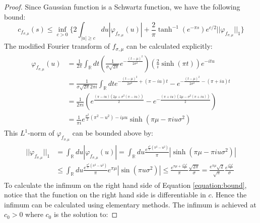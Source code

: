 \documentclass[a4paper,11pt]{article}
\theoremstyle{definition}
\theoremstyle{remark}
\newcommand{\lb}{\left(}
\newcommand{\rb}{\right)}
\begin{document}
\begin{proof}
    Since Gaussian function is a Schwartz function, we have the following bound:
    \begin{equation}\label{equation:bound}
        c_{f_{\sigma,\mu}}(s) \leq \inf_{c > 0}\{2\int_{|u|\geq c}du |\varphi_{f_{\sigma,\mu}}(u)| + \frac{2}{\pi}\tanh^{-1}(e^{-\pi s})e^{c/2}||\varphi_{f_{\sigma,\mu}}||_1\}
    \end{equation}
    The modified Fourier transform of $f_{\sigma,\mu}$ can be calculated explicitly:
    \begin{align}
        \begin{split}
            \varphi_{f_{\sigma,\mu}}(u) &= \frac{1}{2\pi}\int_\mathbb{R} dt \lb \frac{1}{\sigma\sqrt{2\pi}}e^{-\frac{(t - \mu)^2}{2\sigma^2}} \rb\lb \frac{2}{i}\sinh(\pi t) \rb e^{-it u}
            \\&
            =\frac{1}{\sigma\sqrt{2\pi }2\pi i}\int_\mathbb{R} dt e^{-\frac{(t-  \mu)^2}{2\sigma^2} + (\pi - i u) t} - e^{-\frac{(t - \mu)^2}{2\sigma^2} - (\pi + i u) t}
            \\&
            =\frac{1}{2\pi i}\lb e^{\frac{(\pi - iu)(2\mu + \sigma^2(\pi - iu))}{2}} - e^{-\frac{(\pi + iu)(2\mu - \sigma^2(\pi + iu))}{2}}\rb
            \\&
            =\frac{1}{\pi i}e^{\frac{\sigma^2}{2}(\pi^2 - u^2) - i\mu u}\sinh(\pi \mu  - \pi i u\sigma^2)
        \end{split}
    \end{align}
    This $L^1$-norm of $\varphi_{f_{\sigma,\mu}}$ can be bounded above by:
    \begin{align}
        \begin{split}
            ||\varphi_{f_{\sigma,\mu}}||_1 &= \int_\mathbb{R} du |\varphi_{f_{\sigma,\mu}}(u)| = \int_\mathbb{R} du \frac{e^{\frac{\sigma^2}{2}(\pi^2 - u^2)}}{\pi}|\sinh(\pi\mu - \pi i u \sigma^2)|
            \\&
            \leq \int_\mathbb{R}du\frac{e^{\frac{\sigma^2}{2}(\pi^2 - u^2)}}{\pi}e^{\pi\mu}|\sin(\pi u \sigma^2)|\leq \frac{e^{\pi\mu + \frac{\sigma^2\pi^2}{2}}}{\pi}\frac{\sqrt{2\pi}}{\sigma} = \frac{e^{\pi\mu}\sqrt{2}}{\sqrt{\pi}}\frac{e^{\frac{\sigma^2\pi^2}{2}}}{\sigma}
        \end{split}
    \end{align}
    To calculate the infimum on the right hand side of Equation \ref{equation:bound}, notice that the function on the right hand side is differentiable in $c$. Hence the infimum can be calculated using elementary methods. The infimum is achieved at $c_0 > 0$ where $c_0$ is the solution to:

\end{proof}
\end{document}
